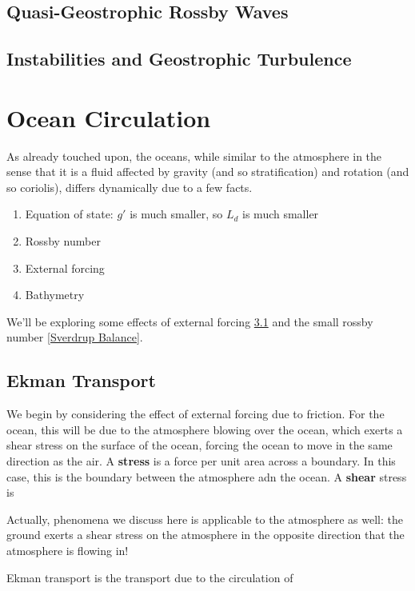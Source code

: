\section{Quasi-Geostrophic Rossby Waves}

\section{Instabilities and Geostrophic Turbulence}

\chapter{Ocean Circulation}\label{Oceans}

As already touched upon, the oceans, while similar to the atmosphere in the sense that it is a fluid affected by gravity (and so stratification) and rotation (and so coriolis), differs dynamically due to a few facts.

\begin{enumerate}
    \item Equation of state: $g'$ is much smaller, so $L_d$ is much smaller
    \item Rossby number
    \item External forcing
    \item Bathymetry
\end{enumerate}

We'll be exploring some effects of external forcing \ref{Ekman Transport} and the small rossby number \ref{Sverdrup Balance}.

\section{Ekman Transport}\label{Ekman Transport}

We begin by considering the effect of external forcing due to friction. For the ocean, this will be due to the atmosphere blowing over the ocean, which exerts a shear stress on the surface of the ocean, forcing the ocean to move in the same direction as the air. A \textbf{stress} is a force per unit area across a boundary. In this case, this is the boundary between the atmosphere adn the ocean. A \textbf{shear} stress is 

Actually, phenomena we discuss here is applicable to the atmosphere as well: the ground exerts a shear stress on the atmosphere in the opposite direction that the atmosphere is flowing in!

Ekman transport is the transport due to the circulation of 

